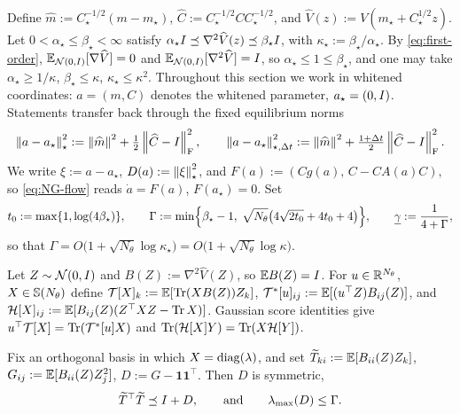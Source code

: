 Define $\widehat m:=C_\star^{-1/2}(m-m_\star)$, $\widehat C:=C_\star^{-1/2}CC_\star^{-1/2}$, and
$\widehat V(z):=V(m_\star+C_\star^{1/2}z)$. Let $0<\alpha_\star\leq\beta_\star<\infty$ satisfy
$\alpha_\star I\preceq\nabla^2\widehat V(z)\preceq\beta_\star I$, with
$\kappa_\star:=\beta_\star/\alpha_\star$. By \eqref{eq:first-order},
$\mathbb{E}_{\mathcal{N}(0,I)}[\nabla\widehat V]=0$ and $\mathbb{E}_{\mathcal{N}(0,I)}[\nabla^2\widehat V]=I$, so
$\alpha_\star\leq1\leq\beta_\star$, and one may take $\alpha_\star\geq1/\kappa$,
$\beta_\star\leq\kappa$, $\kappa_\star\leq\kappa^2$. Throughout this section we work in whitened
coordinates: $a=(m,C)$ denotes the whitened parameter, $a_\star=(0,I)$. Statements transfer back
through the fixed equilibrium norms
\begin{equation}
\label{eq:local-norms}
    \left\lVert a-a_\star\right\rVert_\star^2:=\left\lVert \widehat m\right\rVert^2+\tfrac12\left\lVert \widehat C-I\right\rVert_{\mathrm{F}}^2,
    \qquad
    \left\lVert a-a_\star\right\rVert_{\star,\Delta t}^2:=\left\lVert \widehat m\right\rVert^2+\tfrac{1+\Delta t}2\left\lVert \widehat C-I\right\rVert_{\mathrm{F}}^2 .
\end{equation}
We write $\xi:=a-a_\star$, $D(a):=\left\lVert \xi\right\rVert_\star^2$, and $F(a):=(Cg(a),\,C-CA(a)C)$, so
\eqref{eq:NG-flow} reads $\dot a=F(a)$, $F(a_\star)=0$. Set
\begin{equation}
\label{eq:Gamma}
    t_0:=\max\{1,\log(4\beta_\star)\},
    \qquad
    \Gamma:=\min\Bigl\{\beta_\star-1,\;\sqrt{N_\theta}\bigl(4\sqrt{2t_0}+4t_0+4\bigr)\Bigr\},
    \qquad
    \underline{\gamma}:=\frac1{4+\Gamma} ,
\end{equation}
so that $\Gamma=O\bigl(1+\sqrt{N_\theta}\log\kappa_\star\bigr)=O\bigl(1+\sqrt{N_\theta}\log\kappa\bigr)$.

\begin{definition}
\label{def:linear-score-ops}
Let $Z\sim\mathcal{N}(0,I)$ and $B(Z):=\nabla^2\widehat V(Z)$, so $\mathbb{E} B(Z)=I$. For $u\in\mathbb{R}^{N_\theta}$,
$X\in\mathbb{S}(N_\theta)$ define
$\mathcal T[X]_k:=\mathbb{E}[\operatorname{Tr}(XB(Z))Z_k]$, $\mathcal T^*[u]_{ij}:=\mathbb{E}[(u^\top Z)B_{ij}(Z)]$, and
$\mathcal H[X]_{ij}:=\mathbb{E}[B_{ij}(Z)(Z^\top XZ-\operatorname{Tr} X)]$. Gaussian score identities give
$u^\top\mathcal T[X]=\operatorname{Tr}(\mathcal T^*[u]X)$ and $\operatorname{Tr}(\mathcal H[X]Y)=\operatorname{Tr}(X\mathcal H[Y])$.
\end{definition}

\begin{lemma}
\label{lem:linear-diagonal-bounds}
Fix an orthogonal basis in which $X=\operatorname{diag}(\lambda)$, and set $\widetilde T_{ki}:=\mathbb{E}[B_{ii}(Z)Z_k]$,
$G_{ij}:=\mathbb{E}[B_{ii}(Z)Z_j^2]$, $D:=G-\mathbf1\mathbf1^\top$. Then $D$ is symmetric,
\begin{equation}
\label{eq:T-Schur}
    \widetilde T^\top\widetilde T\preceq I+D,
    \qquad\text{and}\qquad
    \lambda_{\max}(D)\leq\Gamma .
\end{equation}
\end{lemma}

